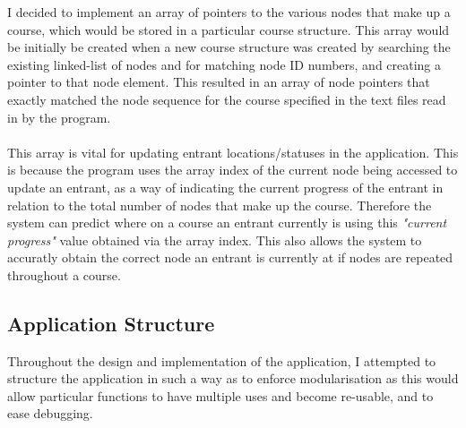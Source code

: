 \documentclass{article}
\begin{document}
I decided to implement an array of pointers to the various nodes that make up a course, which would be stored in a particular course structure. This array would be initially be created when a new course structure was created by searching the existing linked-list of nodes and for matching node ID numbers, and creating a pointer to that node element. This resulted in an array of node pointers that exactly matched the node sequence for the course specified in the text files read in by the program. \\\\
This array is vital for updating entrant locations/statuses in the application. This is because the program uses the array index of the current node being accessed to update an entrant, as a way of indicating the current progress of the entrant in relation to the total number of nodes that make up the course. Therefore the system can predict where on a course an entrant currently is using this \textit{"current progress"} value obtained via the array index. This also allows the system to accuratly obtain the correct node an entrant is currently at if nodes are repeated throughout a course. 

\subsection{Application Structure}

Throughout the design and implementation of the application, I attempted to structure the application in such a way as to enforce modularisation as this would allow particular functions to have multiple uses and become re-usable, and to ease debugging.\\
\end{document}
